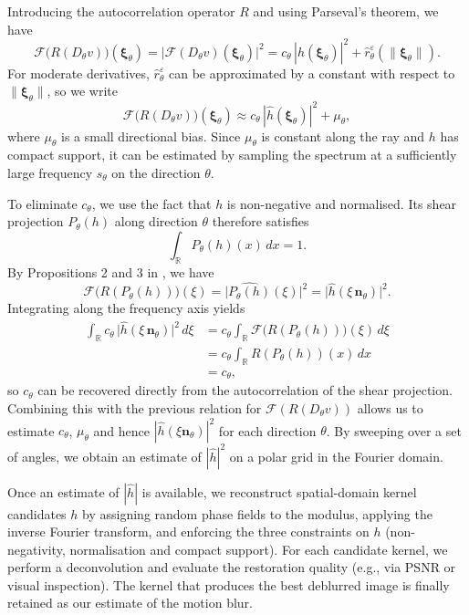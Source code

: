 \documentclass[a4paper,11pt]{article}
\begin{document}
Introducing the autocorrelation operator $R$ and using Parseval's theorem, we have
\[
\mathcal{F}\big(R(D_\theta v)\big)(\bm{\xi}_\theta)
= \big|\mathcal{F}(D_\theta v)(\bm{\xi}_\theta)\big|^2
= c_\theta\,|\hat h(\bm{\xi}_\theta)|^2 + \hat r_\theta^\varepsilon(\|\bm{\xi}_\theta\|).
\]
For moderate derivatives, $\hat r_\theta^\varepsilon$ can be approximated by a constant with respect to $\|\bm{\xi}_\theta\|$, so we write
\[
\mathcal{F}\big(R(D_\theta v)\big)(\bm{\xi}_\theta)
\approx c_\theta\,|\hat h(\bm{\xi}_\theta)|^2 + \mu_\theta,
\]
where $\mu_\theta$ is a small directional bias. Since $\mu_\theta$ is constant along the ray and $h$ has compact support, it can be estimated by sampling the spectrum at a sufficiently large frequency $s_\theta$ on the direction $\theta$.

To eliminate $c_\theta$, we use the fact that $h$ is non-negative and normalised. Its shear projection $P_\theta(h)$ along direction $\theta$ therefore satisfies
\[
\int_{\mathbb{R}} P_\theta(h)(x)\,dx = 1.
\]
By Propositions 2 and 3 in \cite{gf}, we have
\[
\mathcal{F}\big(R(P_\theta(h))\big)(\xi)
= \big|\widehat{P_\theta(h)}(\xi)\big|^2
= \big|\hat h(\xi\,\mathbf{n}_\theta)\big|^2.
\]
Integrating along the frequency axis yields
\begin{align*}
\int_{\mathbb{R}} c_\theta\,\big|\hat h(\xi\,\mathbf{n}_\theta)\big|^2\,d\xi
&= c_\theta \int_{\mathbb{R}} \mathcal{F}\big(R(P_\theta(h))\big)(\xi)\,d\xi \\
&= c_\theta \int_{\mathbb{R}} R(P_\theta(h))(x)\,dx \\ 
&= c_\theta,
\end{align*}
so $c_\theta$ can be recovered directly from the autocorrelation of the shear projection. Combining this with the previous relation for $\mathcal{F}(R(D_\theta v))$ allows us to estimate $c_\theta$, $\mu_\theta$ and hence $|\hat h(\xi\mathbf{n}_\theta)|^2$ for each direction $\theta$. By sweeping over a set of angles, we obtain an estimate of $|\hat h|^2$ on a polar grid in the Fourier domain.

Once an estimate of $|\hat h|$ is available, we reconstruct spatial-domain kernel candidates $h$ by assigning random phase fields to the modulus, applying the inverse Fourier transform, and enforcing the three constraints on $h$ (non-negativity, normalisation and compact support). For each candidate kernel, we perform a deconvolution and evaluate the restoration quality (e.g., via PSNR or visual inspection). The kernel that produces the best deblurred image is finally retained as our estimate of the motion blur.
\end{document}

